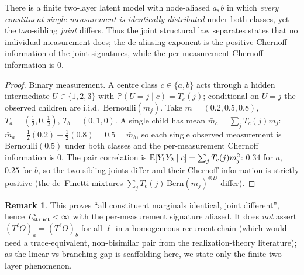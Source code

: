 \documentclass[11pt]{article}
\theoremstyle{plain}
\theoremstyle{definition}\newtheorem{assumption}{Assumption}\newtheorem{remark}{Remark}
\newcommand{\Pf}{\mathbb{P}}\newcommand{\I}{\mathbb{1}}\newcommand{\HH}{\mathbb{H}}\newcommand{\TV}{\mathrm{TV}}
\begin{document}
\begin{proposition}\label{prop:branch}
There is a finite two-layer latent model with node-aliased $a,b$ in which \emph{every constituent single
measurement is identically distributed} under both classes, yet the two-sibling \emph{joint} differs. Thus the
joint structural law separates states that no individual measurement does; the de-aliasing exponent is the positive
Chernoff information of the joint signatures, while the per-measurement Chernoff information is $0$.
\end{proposition}
\begin{proof}
Binary measurement. A centre class $c\in\{a,b\}$ acts through a hidden intermediate $U\in\{1,2,3\}$ with
$\Pf(U{=}j\mid c)=T_c(j)$; conditional on $U{=}j$ the observed children are i.i.d.\ $\mathrm{Bernoulli}(m_j)$. Take
$m=(0.2,0.5,0.8)$, $T_a=(\tfrac12,0,\tfrac12)$, $T_b=(0,1,0)$. A single child has mean
$\bar m_c=\sum_j T_c(j)m_j$: $\bar m_a=\tfrac12(0.2)+\tfrac12(0.8)=0.5=\bar m_b$, so each single observed
measurement is $\mathrm{Bernoulli}(0.5)$ under both classes and the per-measurement Chernoff information is $0$. The
pair correlation is $\mathbb{E}[Y_1Y_2\mid c]=\sum_jT_c(j)m_j^2$: $0.34$ for $a$, $0.25$ for $b$, so the two-sibling joints
differ and their Chernoff information is strictly positive (the de~Finetti mixtures $\sum_jT_c(j)\,
\mathrm{Bern}(m_j)^{\otimes D}$ differ).
\end{proof}
\begin{remark}
This proves ``all constituent marginals identical, joint different'', hence $L^\star_{\mathrm{struct}}<\infty$ with the per-measurement
signature aliased. It does \emph{not} assert $(T^\ell O)_a=(T^\ell O)_b$ for all $\ell$ in a homogeneous recurrent
chain (which would need a trace-equivalent, non-bisimilar pair from the realization-theory literature); as the
linear-vs-branching gap is scaffolding here, we state only the finite two-layer phenomenon.
\end{remark}
\end{document}
